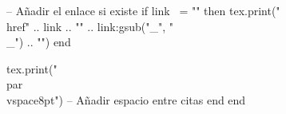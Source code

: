 \begin{flushleft}
\begin{luacode}
        -- Añadir el enlace si existe
        if link ~= "" then
            tex.print("\\href{" .. link .. "}{" .. link:gsub("_", "\\_") .. "}")
        end
        
        tex.print("\\par\\vspace{8pt}") -- Añadir espacio entre citas
    end
end
\end{luacode}
\end{flushleft}
